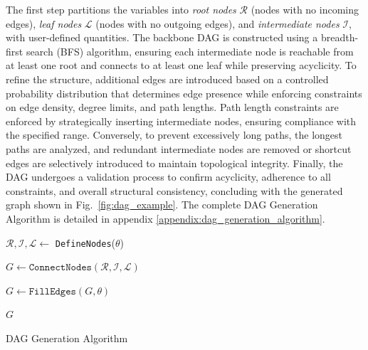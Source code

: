 \documentclass{uai2024} %
\begin{document}
            The first step partitions the variables into \emph{root nodes} $ \mathcal{R} $ (nodes with no incoming edges), \emph{leaf nodes} $ \mathcal{L} $ (nodes with no outgoing edges), and \emph{intermediate nodes} $ \mathcal{I} $, with user-defined quantities. 
            The backbone DAG is constructed using a breadth-first search (BFS) algorithm, ensuring each intermediate node is reachable from at least one root and connects to at least one leaf while preserving acyclicity. 
            To refine the structure, additional edges are introduced based on a controlled probability distribution that determines edge presence while enforcing constraints on edge density, degree limits, and path lengths. 
            Path length constraints are enforced by strategically inserting intermediate nodes, ensuring compliance with the specified range. 
            Conversely, to prevent excessively long paths, the longest paths are analyzed, and redundant intermediate nodes are removed or shortcut edges are selectively introduced to maintain topological integrity. 
            Finally, the DAG undergoes a validation process to confirm acyclicity, adherence to all constraints, and overall structural consistency, concluding with the generated graph shown in Fig.~\ref{fig:dag_example}.
            The complete DAG Generation Algorithm is detailed in appendix \ref{appendix:dag_generation_algorithm}.
            \begin{algorithm}
                \DontPrintSemicolon
            
                $\mathcal{R}, \mathcal{I}, \mathcal{L} \leftarrow$ \texttt{DefineNodes}($\theta$) 
            
                $G \leftarrow \texttt{ConnectNodes}(\mathcal{R}, \mathcal{I}, \mathcal{L})$ 
            
                $G \leftarrow \texttt{FillEdges}(G, \theta)$
            
                \Return $G$
                \caption{DAG Generation Algorithm}
            \end{algorithm}
            
\end{document}
